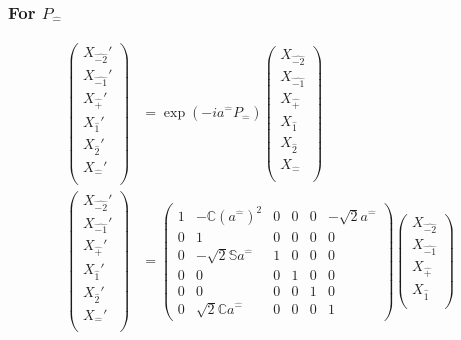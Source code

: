 \documentclass[]{article}
\numberwithin{equation}{section}
\begin{document}
{{\subsubsection{For $P_{\hat{-}}$}
\begin{align}
\begin{pmatrix}
    {X}_{\hat{-2}}'\\
    {X}_{\hat{-1}}'\\
    {X}_{\hat{+}}'\\
    {X}_{\hat{1}}'\\
    {X}_{\hat{2}}'\\
    {X}_{\hat{-}}'\\
    \end{pmatrix}&= \exp{(-ia^{\hat{-}}P_{\hat{-}})}\begin{pmatrix}
    {X}_{\hat{-2}}\\
    {X}_{\hat{-1}}\\
    {X}_{\hat{+}}\\
    {X}_{\hat{1}}\\
    {X}_{\hat{2}}\\
    {X}_{\hat{-}}\\
    \end{pmatrix}\\
    \begin{pmatrix}
    {X}_{\hat{-2}}'\\
    {X}_{\hat{-1}}'\\
    {X}_{\hat{+}}'\\
    {X}_{\hat{1}}'\\
    {X}_{\hat{2}}'\\
    {X}_{\hat{-}}'\\
    \end{pmatrix}&= \begin{pmatrix}
        1&-\mathbb{C}(a^{\hat{-}})^2&0&0&0&-\sqrt{2}a^{\hat{-}}\\
        0&1&0&0&0&0\\
        0&-\sqrt{2}\mathbb{S}a^{\hat{-}}&1&0&0&0\\
        0&0&0&1&0&0\\
        0&0&0&0&1&0\\
        0&\sqrt{2}\mathbb{C}a^{\hat{-}}&0&0&0&1
    \end{pmatrix}\begin{pmatrix}
    {X}_{\hat{-2}}\\
    {X}_{\hat{-1}}\\
    {X}_{\hat{+}}\\
    {X}_{\hat{1}}\\

\end{pmatrix}
\end{align}}}
\end{document}
